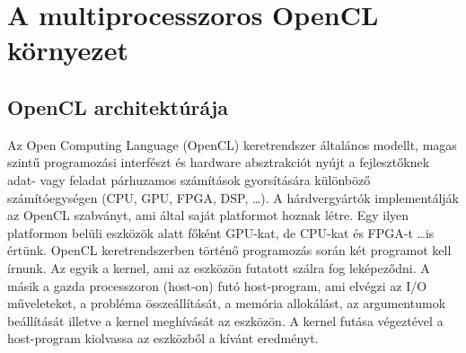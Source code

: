 \chapter{A multiprocesszoros OpenCL környezet} \label{sec:opencl}

\section{OpenCL architektúrája}
	Az Open Computing Language (OpenCL) keretrendszer \cite{opencl}
	általános modellt, magas szintű programozási interfészt és hardware
	absztrakciót nyújt a fejlesztőknek adat- vagy feladat párhuzamos számítások gyorsítására különböző
	számítóegységen (CPU, GPU, FPGA, DSP, \ldots).
	A hárdvergyártók implementálják az OpenCL szabványt, ami által saját platformot
	hoznak létre. Egy ilyen platformon belüli eszközök alatt főként GPU-kat, de
	CPU-kat és FPGA-t \ldots is értünk.
	OpenCL keretrendszerben történő programozás során két programot kell írnunk.
	Az egyik a kernel, ami az eszközön futatott szálra fog leképeződni.
	A másik a gazda processzoron (host-on) futó host-program, ami elvégzi az I/O műveleteket,
	a probléma összeállítását, a memória allokálást, az argumentumok beállítását
	illetve a kernel meghívását az eszközön.
	A kernel futása végeztével a host-program kiolvassa az eszközből
	a kívánt eredményt.
	
